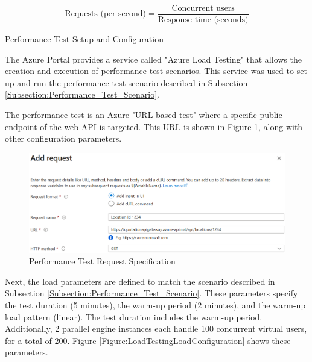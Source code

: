 \documentclass[12pt, reqno]{amsbook}
\makeatletter
\def\subsection{\@startsection{subsection}{2}%
      \z@{.5\linespacing\@plus.7\linespacing}{.25\linespacing}%
      {\normalfont\bfseries\flushleft}}
\theoremstyle{definition}
\theoremstyle{definition}
\numberwithin{section}{chapter}
\numberwithin{table}{chapter}
\numberwithin{figure}{chapter}
\makeatother
\begin{document}
\begin{equation}
  \text{Requests (per second)} = \frac{\text{Concurrent users}}{\text{Response time (seconds)}}
  \label{Equation:Requests_Per_Second}
\end{equation}

\vspace{10pt}

\subsection{Performance Test Setup and Configuration}
\label{Subsection:Performance_Test_Setup_and_Configuration}

The Azure Portal provides a service called "Azure Load Testing" that allows the creation and execution of performance test scenarios. This service was used to set up and run the performance test scenario described in Subsection \ref{Subsection:Performance_Test_Scenario}.

The performance test is an Azure "URL-based test" where a specific public endpoint of the web \ac{API} is targeted. This \ac{URL} is shown in Figure \ref{Figure:LoadTestingRequestSpecification}, along with other configuration parameters.

\begin{figure}[H]
  \centering
  \includegraphics[width=1\linewidth]{images/LoadTestingRequestSpecification.png}
  \caption{\label{Figure:LoadTestingRequestSpecification}Performance Test Request Specification}
\end{figure}

Next, the load parameters are defined to match the scenario described in Subsection \ref{Subsection:Performance_Test_Scenario}. These parameters specify the test duration (5 minutes), the warm-up period (2 minutes), and the warm-up load pattern (linear). The test duration includes the warm-up period. Additionally, 2 parallel engine instances each handle 100 concurrent virtual users, for a total of 200. Figure \ref{Figure:LoadTestingLoadConfiguration} shows these parameters.
\end{document}
